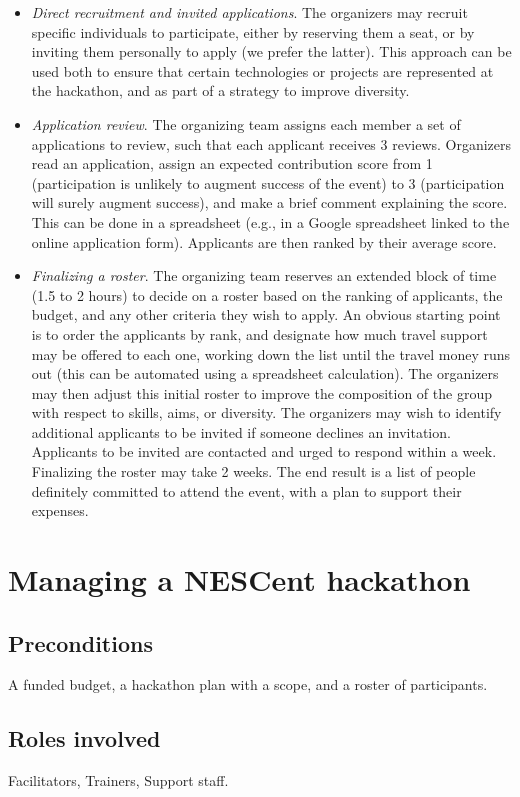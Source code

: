 \documentclass[letterpaper,11pt]{texMemo}
\begin{document}
\begin{itemize}
\item	{\em Direct recruitment and invited applications}. The organizers may recruit specific individuals to participate, either by reserving them a seat, or by inviting them personally to apply (we prefer the latter). This approach can be used both to ensure that certain technologies or projects are represented at the hackathon, and as part of a strategy to improve diversity. 
\item	{\em Application review}. The organizing team assigns each member a set of applications to review, such that each applicant receives 3 reviews. Organizers read an application, assign an expected contribution score from 1 (participation is unlikely to augment success of the event) to 3 (participation will surely augment success), and make a brief comment explaining the score. This can be done in a spreadsheet (e.g., in a Google spreadsheet linked to the online application form). Applicants are then ranked by their average score. 
\item	{\em Finalizing a roster}. The organizing team reserves an extended block of time (1.5 to 2 hours) to decide on a roster based on the ranking of applicants, the budget, and any other criteria they wish to apply. An obvious starting point is to order the applicants by rank, and designate how much travel support may be offered to each one, working down the list until the travel money runs out (this can be automated using a spreadsheet calculation). The organizers may then adjust this initial roster to improve the composition of the group with respect to skills, aims, or diversity. The organizers may wish to identify additional applicants to be invited if someone declines an invitation. Applicants to be invited are contacted and urged to respond within a week. Finalizing the roster may take 2 weeks. The end result is a list of people definitely committed to attend the event, with a plan to support their expenses.  
\end{itemize}

\newpage
\section{Managing a NESCent hackathon}
\subsection{Preconditions}
A funded budget, a hackathon plan with a scope, and a roster of participants. 
\subsection{Roles involved}
Facilitators, Trainers, Support staff. 
\end{document}
